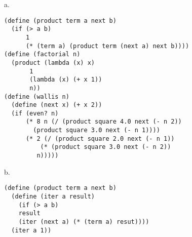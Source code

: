 \documentclass[a4paper,12pt]{article}
\begin{document}
\noindent
a. 
\begin{lstlisting}
(define (product term a next b)
  (if (> a b)
      1
      (* (term a) (product term (next a) next b))))
(define (factorial n)
  (product (lambda (x) x)
	   1
	   (lambda (x) (+ x 1))
	   n))
(define (wallis n)
  (define (next x) (+ x 2))
  (if (even? n)
      (* 8 n (/ (product square 4.0 next (- n 2))
		(product square 3.0 next (- n 1))))
      (* 2 (/ (product square 2.0 next (- n 1))
	      (* (product square 3.0 next (- n 2))
		 n)))))
\end{lstlisting}

\medskip \noindent
b.
\begin{lstlisting}
(define (product term a next b)
  (define (iter a result)
    (if (> a b)
	result
	(iter (next a) (* (term a) resut))))
  (iter a 1))
\end{lstlisting}
\end{document}

